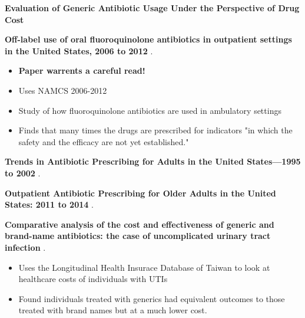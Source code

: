 



\let\counterwithout\relax
\let\counterwithin\relax
{}



\noindent\textbf{Evaluation of Generic Antibiotic Usage Under the Perspective of Drug Cost} \cite{mercanoglu_evaluation_2018}\\
\begin{itemize}

\end{itemize}

\noindent\textbf{Off-label use of oral fluoroquinolone antibiotics in outpatient settings in the United States, 2006 to 2012} \cite{almalki_off-label_2016}.\\
\begin{itemize}
    \item \textbf{Paper warrents a careful read!}
    \item Uses NAMCS 2006-2012
    \item Study of how fluoroquinolone antibiotics are used in ambulatory settings
    \item Finds that many times the drugs are prescribed for indicators "in which the safety and the efficacy are not yet established."
\end{itemize}

\noindent\textbf{Trends in Antibiotic Prescribing for Adults in the United States—1995 to 2002} \cite{roumie_trends_2005}.\\
\begin{itemize}

\end{itemize}

\noindent\textbf{Outpatient Antibiotic Prescribing for Older Adults in the United States: 2011 to 2014} \cite{kabbani_outpatient_2018}.\\
\begin{itemize}

\end{itemize}

\noindent\textbf{Comparative analysis of the cost and effectiveness of generic and brand-name antibiotics: the case of uncomplicated urinary tract infection} \cite{lin_comparative_2017}.\\
\begin{itemize}
    \item Uses the Longitudinal Health Insurace Database of Taiwan to look at healthcare costs of individuals with UTIs
    \item Found individuals treated with generics had equivalent outcomes to those treated with brand names but at a much lower cost.
\end{itemize}

